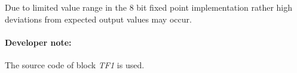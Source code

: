 Due to limited value range in the 8 bit fixed point implementation rather high deviations from expected output values may occur.
\paragraph{Developer note:} The source code of block \textit{TF1} is used.


